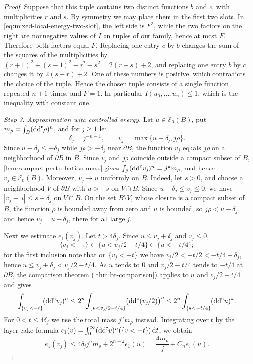 \begin{proof}
Suppose that this tuple contains two distinct functions $b$ and $c$, with multiplicities $r$ and $s$. By symmetry we may place them in the first two slots. In \eqref{eq:mixed-local-energy-two-slot}, the left side is $F^2$, while the two factors on the right are nonnegative values of $I$ on tuples of our family, hence at most $F$. Therefore both factors equal $F$. Replacing one entry $c$ by $b$ changes the sum of the squares of the multiplicities by $(r+1)^2+(s-1)^2-r^2-s^2=2(r-s)+2$, and replacing one entry $b$ by $c$ changes it by $2(s-r)+2$. One of these numbers is positive, which contradicts the choice of the tuple. Hence the chosen tuple consists of a single function repeated $n+1$ times, and $F=1$. In particular $I(u_0,\ldots,u_n)\leq1$, which is the inequality with constant one.

\emph{Step 3. Approximation with controlled energy.}
Let $u\in\mathcal E_0(B)$, put $m_\rho=\int_B(\mathrm{dd}^{\mathrm{c}}\rho)^n$, and for $j\geq1$ let
\[
 \delta_j=j^{-n-1},\qquad v_j=\max\{u-\delta_j,j\rho\}.
\]
Since $u-\delta_j\leq-\delta_j$ while $j\rho>-\delta_j$ near $\partial B$, the function $v_j$ equals $j\rho$ on a neighborhood of $\partial B$ in $B$. Since $v_j$ and $j\rho$ coincide outside a compact subset of $B$, \cref{lem:compact-perturbation-mass} gives $\int_B(\mathrm{dd}^{\mathrm{c}} v_j)^n=j^nm_\rho$, and hence $v_j\in\mathcal E_0(B)$. Moreover, $v_j\to u$ uniformly on $B$. Indeed, let $s>0$, and choose a neighborhood $V$ of $\partial B$ with $u>-s$ on $V\cap B$. Since $u-\delta_j\leq v_j\leq0$, we have $|v_j-u|\leq s+\delta_j$ on $V\cap B$. On the set $B\setminus V$, whose closure is a compact subset of $B$, the function $\rho$ is bounded away from zero and $u$ is bounded, so $j\rho<u-\delta_j$, and hence $v_j=u-\delta_j$, there for all large $j$.

Next we estimate $e_1(v_j)$. Let $t>4\delta_j$. Since $u\leq v_j+\delta_j$ and $v_j\leq0$,
\[
 \{v_j<-t\}\subset\{u<v_j/2-t/4\}
                       \subset\{u<-t/4\};
\]
for the first inclusion note that on $\{v_j<-t\}$ we have $v_j/2<-t/2<-t/4-\delta_j$, hence $u\leq v_j+\delta_j<v_j/2-t/4$. As $u$ tends to $0$ and $v_j/2-t/4$ tends to $-t/4$ at $\partial B$, the comparison theorem (\cref{thm:bt-comparison}) applies to $u$ and $v_j/2-t/4$ and gives
\[
 \int_{\{v_j<-t\}}(\mathrm{dd}^{\mathrm{c}} v_j)^n
       \leq2^n\int_{\{u<v_j/2-t/4\}}\bigl(\mathrm{dd}^{\mathrm{c}}(v_j/2)\bigr)^n
       \leq2^n\int_{\{u<-t/4\}}(\mathrm{dd}^{\mathrm{c}} u)^n.
\]
For $0<t\leq4\delta_j$ we use the total mass $j^nm_\rho$ instead. Integrating over $t$ by the layer-cake formula $e_1(v)=\int_0^\infty(\mathrm{dd}^{\mathrm{c}} v)^n(\{v<-t\})\,\mathrm dt$, we obtain
\begin{equation}\label{eq:quadratic-boundary-energy-approximation}
 e_1(v_j)\leq4\delta_j j^n m_\rho+2^{n+2}e_1(u)
                 =\frac{4m_\rho}j+C_ne_1(u).
\end{equation}


\end{proof}

